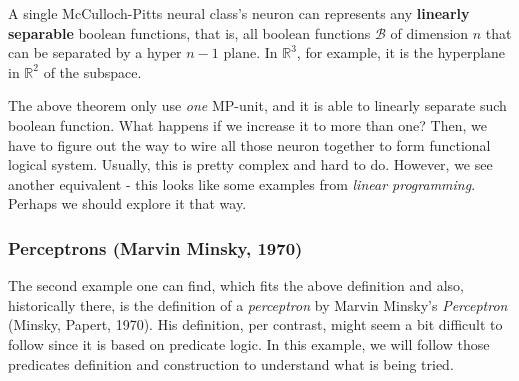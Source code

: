 \begin{theorem}
    A single McCulloch-Pitts neural class's neuron can represents any \textbf{linearly separable} boolean functions, that is, all boolean functions $\mathcal{B}$ of dimension $n$ that can be separated by a hyper $n-1$ plane. In $\mathbb{R}^3$, for example, it is the hyperplane in $\mathbb{R}^{2}$ of the subspace. 
\end{theorem}

The above theorem only use \textit{one} MP-unit, and it is able to linearly separate such boolean function. What happens if we increase it to more than one? Then, we have to figure out the way to wire all those neuron together to form functional logical system. Usually, this is pretty complex and hard to do. However, we see another equivalent - this looks like some examples from \textit{linear programming}. Perhaps we should explore it that way. 
\subsubsection{Perceptrons (Marvin Minsky, 1970)}
The second example one can find, which fits the above definition and also, historically there, is the definition of a \textit{perceptron} by Marvin Minsky's \textit{Perceptron} (Minsky, Papert, 1970). His definition, per contrast, might seem a bit difficult to follow since it is based on predicate logic. In this example, we will follow those predicates definition and construction to understand what is being tried. 
\vspace{2mm}

